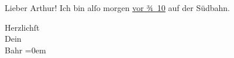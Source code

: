 \pstart{}Lieber Arthur!\pend\vspace{0.5em}
\pstart
           Ich bin alſo morgen \uline{vor ¾ 10} auf der Südbahn.\pend
           
\pstart
           Herzlichſt{\\[\baselineskip]}Dein{\\[\baselineskip]}\spacefill\mbox{Bahr}\pend
           \leftskip=0em{}\endnumbering{}  \newcommand{\dateiname}{L00315}\newcommand{\titel}{Hermann Bahr an Arthur Schnitzler, 21. 4. 1894}\newcommand{\editorInnen}{Herausgegeben von Martin Anton Müller}
